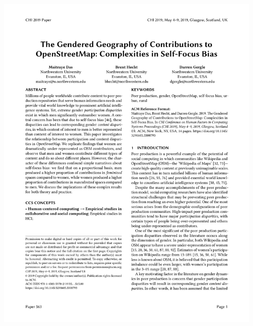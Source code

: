 \documentclass[presentation]{subfiles}
\begin{document}
\begin{frame}[t]
    
\begin{columns}
\begin{column}{\textwidth}
\includegraphics[width=\textwidth]{figures/osm_cover.png}
\end{column}
\end{columns}

\end{frame}
\end{document}
